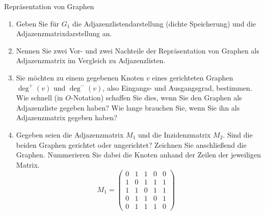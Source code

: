 \documentclass[11pt,a4paper]{article}
\begin{document}
\begin{aufgabe}{1}{Repräsentation von Graphen}
\begin{figure}[h!]
    \end{figure}
    \begin{enumerate}
        \item Geben Sie für $G_1$ die Adjazenzlistendarstellung (dichte Speicherung) und die Adjazenzmatrixdarstellung an.
        \item Nennen Sie zwei Vor- und zwei Nachteile der Repräsentation von Graphen als Adjazenzmatrix im Vergleich zu Adjazenzlisten.
        \item Sie möchten zu einem gegebenen Knoten $v$ eines gerichteten Graphen $\operatorname{deg}^+(v)$ und $\operatorname{deg}^-(v)$, also Eingangs- und Ausgangsgrad, bestimmen.
        Wie schnell (in $O$-Notation) schaffen Sie dies, wenn Sie den Graphen als Adjazenzliste gegeben haben?
        Wie lange brauchen Sie, wenn Sie ihn als Adjazenzmatrix gegeben haben?
        \item 
        Gegeben seien die Adjazenzmatrix $M_1$ und die Inzidenzmatrix $M_2$.
        Sind die beiden Graphen gerichtet oder ungerichtet?
        Zeichnen Sie anschließend die Graphen.
        Nummerieren Sie dabei die Knoten anhand der Zeilen der jeweiligen Matrix.
        \begin{equation*}
            M_1 = \begin{pmatrix}
                0 & 1 & 1 & 0 & 0 \\
                1 & 0 & 1 & 1 & 1 \\
                1 & 1 & 0 & 1 & 1 \\
                0 & 1 & 1 & 0 & 1 \\
                0 & 1 & 1 & 1 & 0 
            \end{pmatrix}\,\,\,\,

\end{equation*}
\end{enumerate}
\end{aufgabe}
\end{document}
